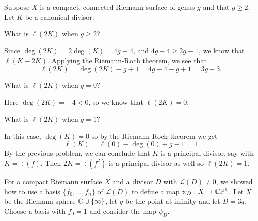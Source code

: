 \documentclass[expanded]{lkx_pset}
\begin{document}
\begin{problem}{2}
Suppose $X$ is a compact, connected Riemann surface of genus $g$ and that $g\geq 2$. Let $K$ be a canonical divisor.
\end{problem}

\begin{parts}
	\begin{part}{}
		What is $\ell(2K)$ when $g\geq 2$?
	\end{part}
	Since $\deg(2K)=2\deg(K)=4g-4$, and $4g-4\geq 2g-1$, we know that $\ell(K-2K)$. Applying the Riemann-Roch theorem, we see that
	\[
		\ell(2K) = \deg(2K) - g  + 1 = 4g-4 - g + 1 = 3g-3.
	\]

	\begin{part}{}
		What is $\ell(2K)$ when $g = 0$?
	\end{part}

	Here $\deg(2K)=-4<0$, so we know that $\ell(2K)=0$.

	\begin{part}{}
		What is $\ell(2K)$ when $g = 1$?
	\end{part}

	In this case, $\deg(K)=0$ so by the Riemann-Roch theorem we get
	\[
		\ell(K) = \ell(0) - \deg(0)+g-1=1
	\]
	By the previous problem, we can conclude that $K$ is a principal divisor, say with $K=\div(f)$. Then $2K = \div(f^2)$ is a principal divisor as well so $\ell(2K)=1$.
\end{parts}

\begin{problem}{3}
For a compact Riemann surface $X$ and a divisor $D$ with $\mathcal{L}(D)\neq 0$, we showed how to use a basis $\{f_0,\ldots, f_n\}$ of $\mathcal{L}(D)$ to define a map $\psi_D : X \to \mathbb{CP}^n$. Let $X$ be the Riemann sphere $\mathbb{C}\cup \{\infty\}$, let $q$ be the point at infinity and let $D=3q$. Choose a basis with $f_0=1$ and consider the map $\psi_D$.
\end{problem}
\end{document}
